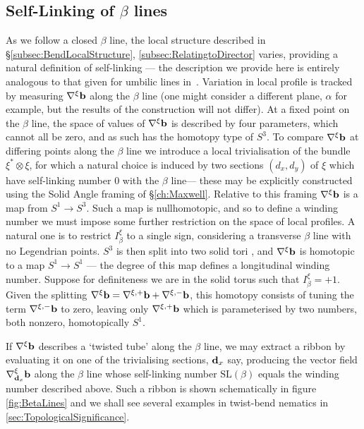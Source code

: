 {\subsection{Self-Linking of $\beta$ lines}
\label{subsec:Self-Linking}
As we follow a closed $\beta$ line, the local structure described in \S\ref{subsec:BendLocalStructure}, \ref{subsec:RelatingtoDirector} varies, providing a natural definition of self-linking --- the description we provide here is entirely analogous to that given for umbilic lines in~\citep{Machon2016b}. Variation in local profile is tracked by measuring $\nabla^\xi \mathbf{b}$ along the $\beta$ line (one might consider a different plane, $\alpha$ for example, but the results of the construction will not differ). At a fixed point on the $\beta$ line, the space of values of $\nabla^\xi \mathbf{b}$ is described by four parameters, which cannot all be zero, and as such has the homotopy type of $S^3$. To compare $\nabla^\xi \mathbf{b}$ at differing points along the $\beta$ line we introduce a local trivialisation of the bundle $\xi^*\otimes\xi$, for which a natural choice is induced by two sections $(d_x,d_y)$ of $\xi$ which have self-linking number $0$ with the $\beta$ line--- these may be explicitly constructed using the Solid Angle framing of \S\ref{ch:Maxwell}. Relative to this framing $\nabla^\xi \mathbf{b}$ is a map from $S^1 \rightarrow S^3$. Such a map is nullhomotopic, and so to define a winding number we must impose some further restriction on the space of local profiles. A natural one is to restrict $I_\beta^\xi$ to a single sign, considering a transverse $\beta$ line with no Legendrian points. $S^3$ is then split into two solid tori \citep{Machon2016b}, and $\nabla^\xi \mathbf{b}$ is homotopic to a map $S^1 \rightarrow S^1$ --- the degree of this map defines a longitudinal winding number. Suppose for definiteness we are in the solid torus such that $I^\xi_\beta= +1$. Given the splitting $\nabla^\xi \mathbf{b} =  \nabla^{\xi,+}\mathbf{b} +\nabla^{\xi,-}\mathbf{b}$, this homotopy consists of tuning the term $\nabla^{\xi,-}\mathbf{b}$ to zero, leaving only $\nabla^{\xi,+}\mathbf{b}$ which is parameterised by two numbers, both nonzero, homotopically $S^1$.

If $\nabla^\xi \mathbf{b}$ describes a `twisted tube' along the $\beta$ line, we may extract a ribbon by evaluating it on one of the trivialising sections, $\mathbf{d}_x$ say, producing the vector field $\nabla^\xi_{\mathbf{d}_x} \mathbf{b}$ along the $\beta$ line whose self-linking number $\mathrm{SL}(\beta)$ equals the winding number described above. Such a ribbon is shown schematically in figure \ref{fig:BetaLines} and we shall see several examples in twist-bend nematics in \ref{sec:TopologicalSignificance}.
 
}

